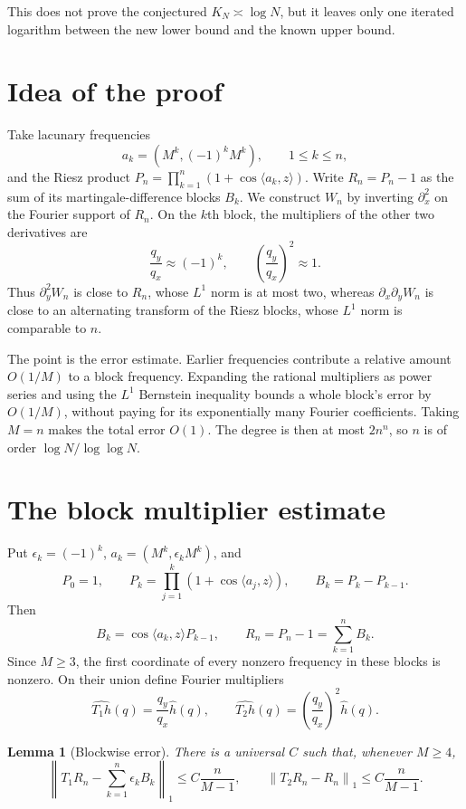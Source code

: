 \documentclass[11pt]{article}
\newtheorem{lemma}[theorem]{Lemma}
\newcommand{\norm}[1]{\left\lVert #1\right\rVert}
\begin{document}
This does not prove the conjectured $K_N\asymp\log N$, but it leaves only one
iterated logarithm between the new lower bound and the known upper bound.

\section{Idea of the proof}

Take lacunary frequencies
\[
        a_k=(M^k,(-1)^kM^k),\qquad 1\le k\le n,
\]
and the Riesz product $P_n=\prod_{k=1}^n(1+\cos\langle a_k,z\rangle)$.
Write $R_n=P_n-1$ as the sum of its martingale-difference blocks $B_k$.
We construct $W_n$ by inverting $\partial_x^2$ on the Fourier support of
$R_n$.  On the $k$th block, the multipliers of the other two derivatives are
\[
 \frac{q_y}{q_x}\approx(-1)^k,
 \qquad
 \left(\frac{q_y}{q_x}\right)^2\approx1.
\]
Thus $\partial_y^2W_n$ is close to $R_n$, whose $L^1$ norm is at most two,
whereas $\partial_x\partial_yW_n$ is close to an alternating transform of the
Riesz blocks, whose $L^1$ norm is comparable to $n$.

The point is the error estimate.  Earlier frequencies contribute a relative
amount $O(1/M)$ to a block frequency.  Expanding the rational multipliers as
power series and using the $L^1$ Bernstein inequality bounds a whole block's
error by $O(1/M)$, without paying for its exponentially many Fourier
coefficients.  Taking $M=n$ makes the total error $O(1)$.  The degree is then
at most $2n^n$, so $n$ is of order $\log N/\log\log N$.

\section{The block multiplier estimate}

Put $\epsilon_k=(-1)^k$, $a_k=(M^k,\epsilon_kM^k)$, and
\[
 P_0=1,\qquad P_k=\prod_{j=1}^k(1+\cos\langle a_j,z\rangle),
 \qquad B_k=P_k-P_{k-1}.
\]
Then
\[
 B_k=\cos\langle a_k,z\rangle P_{k-1},
 \qquad R_n=P_n-1=\sum_{k=1}^nB_k.
\]
Since $M\ge3$, the first coordinate of every nonzero frequency in these
blocks is nonzero.  On their union define Fourier multipliers
\[
 \widehat{T_1h}(q)=\frac{q_y}{q_x}\widehat h(q),
 \qquad
 \widehat{T_2h}(q)=\left(\frac{q_y}{q_x}\right)^2\widehat h(q).
\]

\begin{lemma}[Blockwise error]\label{lem:block}
There is a universal $C$ such that, whenever $M\ge4$,
\[
 \norm{T_1R_n-\sum_{k=1}^n\epsilon_kB_k}_1
 \le C\frac{n}{M-1},
 \qquad
 \norm{T_2R_n-R_n}_1
 \le C\frac{n}{M-1}.
\]
\end{lemma}
\end{document}
